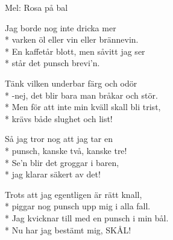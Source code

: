 \begin{SongText}
    \begin{SongInfo}
        Mel: Rosa på bal
    \end{SongInfo}
    \begin{SongVerse}
        Jag borde nog inte dricka mer\\*%
        varken öl eller vin eller brännevin.\\*%
        En kaffetår blott, men såvitt jag ser\\*%
        står det punsch brevi’n.
    \end{SongVerse}
    \begin{SongVerse}
        Tänk vilken underbar färg och odör\\*%
        -nej, det blir bara man bråkar och stör.\\*%
        Men för att inte min kväll skall bli trist,\\*%
        krävs både slughet och list!
    \end{SongVerse}
    \begin{SongVerse}
        Så jag tror nog att jag tar en\\*%
        punsch, kanske två, kanske tre!\\*%
        Se’n blir det groggar i baren,\\*%
        jag klarar säkert av det!
    \end{SongVerse}
    \begin{SongVerse}
        Trots att jag egentligen är rätt knall,\\*%
        piggar nog punsch upp mig i alla fall.\\*%
        Jag kvicknar till med en punsch i min bål.\\*%
        Nu har jag bestämt mig, SKÅL!
    \end{SongVerse}\end{SongText}
